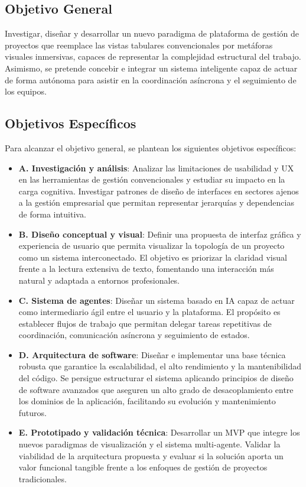 \subsection{Objetivo General}
Investigar, diseñar y desarrollar un nuevo paradigma de plataforma de gestión de proyectos que reemplace las vistas tabulares convencionales por metáforas visuales inmersivas, capaces de representar la complejidad estructural del trabajo. Asimismo, se pretende concebir e integrar un sistema inteligente capaz de actuar de forma autónoma para asistir en la coordinación asíncrona y el seguimiento de los equipos.

\subsection{Objetivos Específicos}
Para alcanzar el objetivo general, se plantean los siguientes objetivos específicos:

\begin{itemize}
    \item \textbf{A. Investigación y análisis}: Analizar las limitaciones de usabilidad y \ac{UX} en las herramientas de gestión convencionales y estudiar su impacto en la carga cognitiva. Investigar patrones de diseño de interfaces en sectores ajenos a la gestión empresarial que permitan representar jerarquías y dependencias de forma intuitiva.
    
    \item \textbf{B. Diseño conceptual y visual}: Definir una propuesta de interfaz gráfica y experiencia de usuario que permita visualizar la topología de un proyecto como un sistema interconectado. El objetivo es priorizar la claridad visual frente a la lectura extensiva de texto, fomentando una interacción más natural y adaptada a entornos profesionales.
    
    \item \textbf{C. Sistema de agentes}: Diseñar un sistema basado en \ac{IA} capaz de actuar como intermediario ágil entre el usuario y la plataforma. El propósito es establecer flujos de trabajo que permitan delegar tareas repetitivas de coordinación, comunicación asíncrona y seguimiento de estados.
    
    \item \textbf{D. Arquitectura de software}: Diseñar e implementar una base técnica robusta que garantice la escalabilidad, el alto rendimiento y la mantenibilidad del código. Se persigue estructurar el sistema aplicando principios de diseño de software avanzados que aseguren un alto grado de desacoplamiento entre los dominios de la aplicación, facilitando su evolución y mantenimiento futuros.
    
    \item \textbf{E. Prototipado y validación técnica}: Desarrollar un \ac{MVP} que integre los nuevos paradigmas de visualización y el sistema multi-agente. Validar la viabilidad de la arquitectura propuesta y evaluar si la solución aporta un valor funcional tangible frente a los enfoques de gestión de proyectos tradicionales.
\end{itemize}


